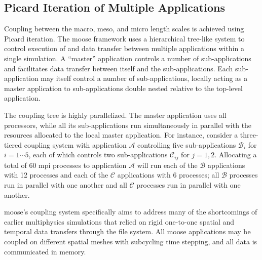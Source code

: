 \subsection{Picard Iteration of Multiple Applications}
\label{sec:multiscale_solution}

Coupling between the macro, meso, and micro length scales is achieved using Picard iteration. The \gls{moose} framework uses a hierarchical tree-like system to control execution of and data transfer between multiple applications within a single simulation. A ``master'' application controls a number of sub-applications and facilitates data transfer between itself and the sub-applications. Each sub-application may itself control a number of sub-applications, locally acting as a master application to sub-applications double nested relative to the top-level application. 

The coupling tree is highly parallelized. The master application uses all processors, while all its sub-applications run simultaneously in parallel with the resources allocated to the local master application. For instance, consider a three-tiered coupling system with application \(\mathcal{A}\) controlling five sub-applications \(\mathcal{B}_i\) for \(i=1\cdots 5\), each of which controls two sub-applications \(\mathcal{C}_{ij}\) for \(j=1, 2\). Allocating a total of 60 \gls{mpi} processes to application \(\mathcal{A}\) will run each of the \(\mathcal{B}\) applications with 12 processes and each of the \(\mathcal{C}\) applications with 6 processes; all \(\mathcal{B}\) processes run in parallel with one another and all \(\mathcal{C}\) processes run in parallel with one another. 

\gls{moose}'s coupling system specifically aims to address many of the shortcomings of earlier multiphysics simulations that relied on rigid one-to-one spatial and temporal data transfers through the file system. All \gls{moose} applications may be coupled on different spatial meshes with subcycling time stepping, and all data is communicated in memory. 

